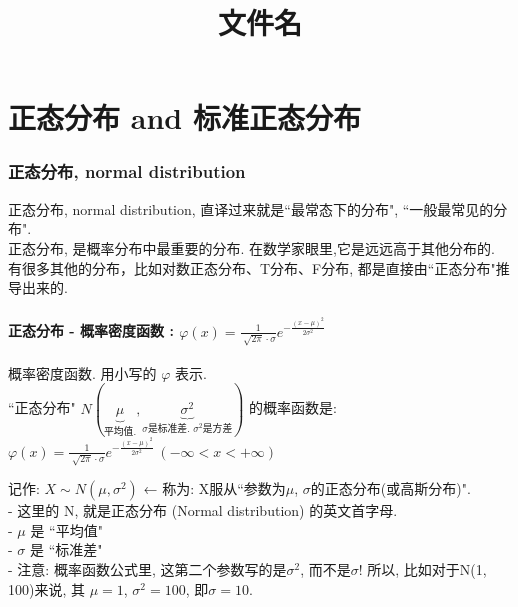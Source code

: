 \documentclass[UTF8]{ctexart}
\title{文件名}
\begin{document}
	\tableofcontents %
	\date{} %
	\maketitle  %

	\part{正态分布 and 标准正态分布}
	
	\section{正态分布, normal distribution}
	
	正态分布, normal distribution, 直译过来就是``最常态下的分布", ``一般最常见的分布". \\
	正态分布, 是概率分布中最重要的分布. 在数学家眼里,它是远远高于其他分布的. 有很多其他的分布，比如对数正态分布、T分布、F分布, 都是直接由``正态分布"推导出来的. \\
	
	
	
	
	
	
	
	
	
	
	

\subsection{正态分布 - 概率密度函数 : $\boxed{
	\varphi (x)=\frac{1}{\sqrt[]{2\pi}\cdot \sigma}e^{-\frac{(x-\mu )^2}{2\sigma ^2}}
}$ }
	
	概率密度函数. 用小写的 $\varphi$ 表示. \\
	``正态分布" $N(\underset{\text{平均值}.}{\underbrace{\mu }},\underset{\sigma \text{是标准差.\ }\sigma ^2\text{是方差}}{\underbrace{\sigma ^2}})	$ 的概率函数是: 
	 $\boxed{
		\varphi (x)=\frac{1}{\sqrt[]{2\pi}\cdot \sigma}e^{-\frac{(x-\mu )^2}{2\sigma ^2}} \ (-\infty <x<+\infty )
	}$  \\
\vspace{1em} 

	记作: $\boxed{X \sim N(\mu ,\sigma ^2)}$   ← 称为: X服从``参数为$\mu$, $\sigma$的正态分布(或高斯分布)". \\	
	- 这里的 N, 就是正态分布 (Normal distribution) 的英文首字母.\\
	- $\mu$ 是 ``平均值" \\
	- $\sigma$ 是 ``标准差" \\
	- 注意: 概率函数公式里, 这第二个参数写的是$\sigma ^2$, 而不是$\sigma$! 所以, 比如对于N(1, 100)来说, 其 $\mu=1$,  $\sigma ^2=100$, 即$\sigma=10$. \\
	
\end{document}
